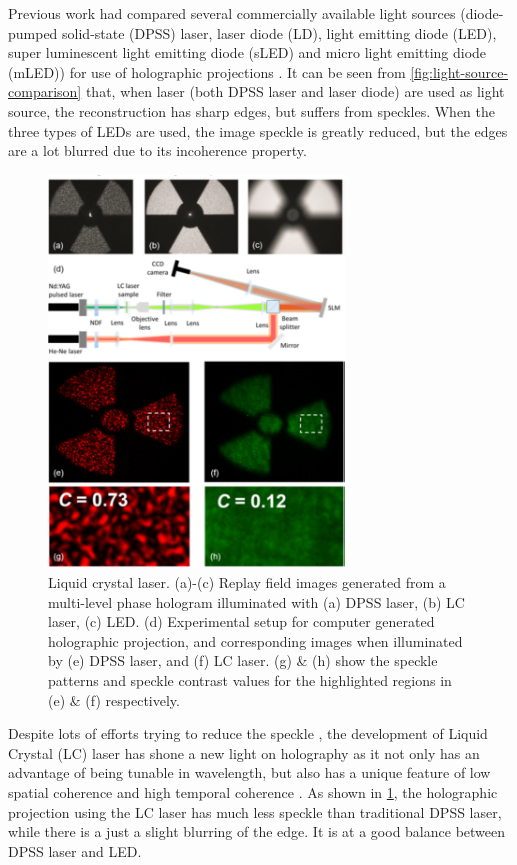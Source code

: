 Previous work had compared several commercially available light sources (diode-pumped solid-state (DPSS) laser, laser diode (LD), light emitting diode (LED), super luminescent light emitting diode (sLED) and micro light emitting diode (mLED)) for use of holographic projections \cite{Deng2017}. It can be seen from \cref{fig:light-source-comparison} that, when laser (both DPSS laser and laser diode) are used as light source, the reconstruction has sharp edges, but suffers from speckles. When the three types of LEDs are used, the image speckle is greatly reduced, but the edges are a lot blurred due to its incoherence property.

\begin{figure}[H]
  \centering
  \includegraphics[width=0.7\textwidth]{liquid-crystal-laser.png}
  \caption{Liquid crystal laser. (a)-(c) Replay field images generated from a multi-level phase hologram illuminated with (a) DPSS laser, (b) LC laser, (c) LED. (d) Experimental setup for computer generated holographic projection, and corresponding images when illuminated by (e) DPSS laser, and (f) LC laser. (g) \& (h) show the speckle patterns and speckle contrast values for the highlighted regions in (e) \& (f) respectively. \cite{Hands2022}} \label{fig:liquid-crystal-laser}
\end{figure}

Despite lots of efforts trying to reduce the speckle \cite{Stangner2017, Deng2021}, the development of Liquid Crystal (LC) laser has shone a new light on holography as it not only has an advantage of being tunable in wavelength, but also has a unique feature of low spatial coherence and high temporal coherence \cite{Hands2022}. As shown in \cref{fig:liquid-crystal-laser}, the holographic projection using the LC laser has much less speckle than traditional DPSS laser, while there is a just a slight blurring of the edge. It is at a good balance between DPSS laser and LED.

